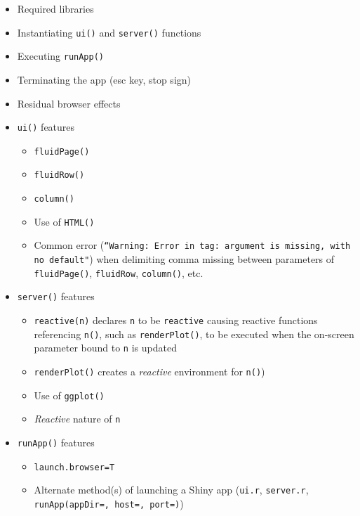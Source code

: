 \documentclass[10pt, letterpaper]{article}
\begin{document}
\begin{spacing}{1.0}
\begin{itemize}
    \item Required libraries
    \item Instantiating \texttt{ui()} and \texttt{server()} functions
    \item Executing \texttt{runApp()}
    \item Terminating the app (esc key, stop sign)
    \item Residual browser effects
    \item \texttt{ui()} features
      \begin{itemize}
          \item \texttt{fluidPage()}
          \item \texttt{fluidRow()}
          \item \texttt{column()}
          \item Use of \texttt{HTML()}
          \item Common error (\texttt{``Warning: Error in tag: argument is missing, with no default"}) when delimiting comma missing between parameters of \texttt{fluidPage()}, \texttt{fluidRow}, \texttt{column()}, etc.  
      \end{itemize}
    \item \texttt{server()} features
      \begin{itemize}
          \item \texttt{reactive(n)} declares \texttt{n} to be \texttt{reactive} causing reactive functions referencing \texttt{n()}, such as \texttt{renderPlot()}, to be executed when the on-screen parameter bound to \texttt{n} is updated  
          \item \texttt{renderPlot()} creates a \textit{reactive} environment for \texttt{n()})
          \item Use of \texttt{ggplot()}
          \item \textit{Reactive} nature of \texttt{n}
      \end{itemize}
    \item \texttt{runApp()} features
      \begin{itemize}
          \item \texttt{launch.browser=T}
          \item Alternate method(s) of launching a Shiny app (\texttt{ui.r}, \texttt{server.r}, \texttt{runApp(appDir=, host=, port=)})
      \end{itemize}
\end{itemize}



\end{spacing}
\end{document}
